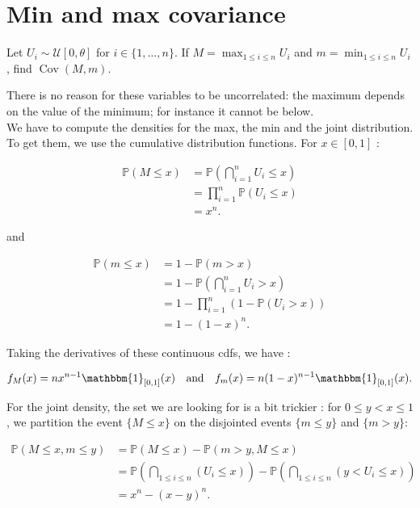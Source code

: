 \section{Min and max covariance}

\begin{tcolorbox}[width=\linewidth, sharp corners=all, colback=white!95!black]
Let $U_i \sim \mathcal{U}[0,\theta]$ for $i \in \{1,\dots,n\}.$ If $M = \max_{1\leq i \leq n} U_i$ and $m = \min_{1\leq i \leq n} U_i$, find $\operatorname{Cov}(M,m)$.
\end{tcolorbox}

There is no reason for these variables to be uncorrelated: the maximum depends on the value of the minimum; for instance it cannot be below.\\

We have to compute the densities for the max, the min and the joint distribution. To get them, we use the cumulative distribution functions. For $x \in [0,1]$ : 

\begin{align*}
    \mathbb{P}(M \le x) &= \mathbb{P}\left(\bigcap_{i=1}^{n} {U_i \le x}\right)\\
    &= \prod_{i=1}^{n} \mathbb{P}(U_i \le x)\\
    &= x^n.
\end{align*}

and

\begin{align*}
    \mathbb{P}(m \le x) &= 1 - \mathbb{P}(m > x)\\
    &= 1 - \mathbb{P}\left(\bigcap_{i=1}^{n} {U_i > x}\right)\\
    &= 1 - \prod_{i=1}^{n} (1- \mathbb{P}(U_i > x))\\
    &= 1 - (1 - x)^n.
\end{align*}

Taking the derivatives of these continuous cdfs, we have :

$$f_M(x) = n x^{n-1} \mathbbm{1}_{[0, 1]}(x) \quad \text{and} \quad f_m(x) = n (1 - x)^{n-1} \mathbbm{1}_{[0, 1]}(x).$$

For the joint density, the set we are looking for is a bit trickier : for $0\le y < x \le 1$, we partition the event $\{M\le x\}$ on the disjointed events $\{m\le y\}$ and $\{m > y\}$: 

\begin{align*}
\mathbb{P}(M\le x,m\le y)&=\mathbb{P}(M\le x)-\mathbb{P}(m>y,M\le x) \\
&=\mathbb{P}\left(\bigcap_{1\le i\le n}(U_i\le x)\right)-\mathbb{P}\left(\bigcap_{1\le i\le n}(y<U_i\le x)\right) \\
&=x^n-(x-y)^n.
\end{align*}


